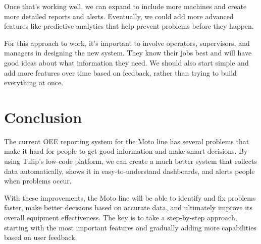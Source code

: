 \documentclass[11pt]{article}
\begin{document}
Once that's working well, we can expand to include more machines and create more detailed reports and alerts. Eventually, we could add more advanced features like predictive analytics that help prevent problems before they happen.

For this approach to work, it's important to involve operators, supervisors, and managers in designing the new system. They know their jobs best and will have good ideas about what information they need. We should also start simple and add more features over time based on feedback, rather than trying to build everything at once.

\section{Conclusion}

The current OEE reporting system for the Moto line has several problems that make it hard for people to get good information and make smart decisions. By using Tulip's low-code platform, we can create a much better system that collects data automatically, shows it in easy-to-understand dashboards, and alerts people when problems occur.

With these improvements, the Moto line will be able to identify and fix problems faster, make better decisions based on accurate data, and ultimately improve its overall equipment effectiveness. The key is to take a step-by-step approach, starting with the most important features and gradually adding more capabilities based on user feedback.
\end{document}
